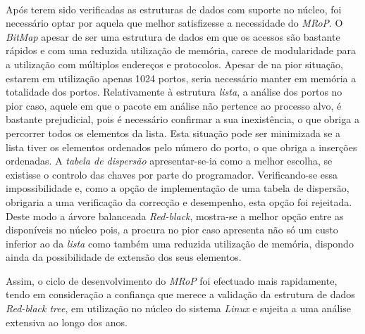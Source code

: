 \paragraph*{}

Após terem sido verificadas as estruturas de dados com suporte no núcleo, foi necessário optar por aquela que melhor satisfizesse a necessidade do \textit{MRoP}.
O \textit{BitMap} apesar de ser uma estrutura de dados em que os acessos são bastante rápidos e com uma reduzida utilização de memória, carece de modularidade para a utilização com múltiplos endereços e protocolos.
Apesar de na pior situação, estarem em utilização apenas 1024 portos, seria necessário manter em memória a totalidade dos portos.
Relativamente à estrutura \textit{lista}, a análise dos portos no pior caso, aquele em que o pacote em análise não pertence ao processo alvo, é bastante prejudicial, pois é necessário confirmar a sua inexistência, o que obriga a percorrer todos os elementos da lista.
Esta situação pode ser minimizada se a lista tiver os elementos ordenados pelo número do porto, o que obriga a inserções ordenadas.
A \textit{tabela de dispersão} apresentar-se-ia como a melhor escolha, se existisse o controlo das chaves por parte do programador.
Verificando-se essa impossibilidade e, como a opção de implementação de uma tabela de dispersão, obrigaria a uma verificação da correcção e desempenho, esta opção foi rejeitada.  
Deste modo a árvore balanceada \textit{Red-black}, mostra-se a melhor opção entre as disponíveis no núcleo pois, a procura no pior caso apresenta não só um custo inferior ao da \textit{lista} como também uma reduzida utilização de memória, dispondo ainda da possibilidade de extensão dos seus elementos.


Assim, o ciclo de desenvolvimento do \textit{MRoP} foi efectuado mais rapidamente, tendo em consideração a confiança que merece a validação da estrutura de dados \textit{Red-black tree}, em utilização no núcleo do sistema \textit{Linux} e sujeita a uma análise extensiva ao longo dos anos.
 
